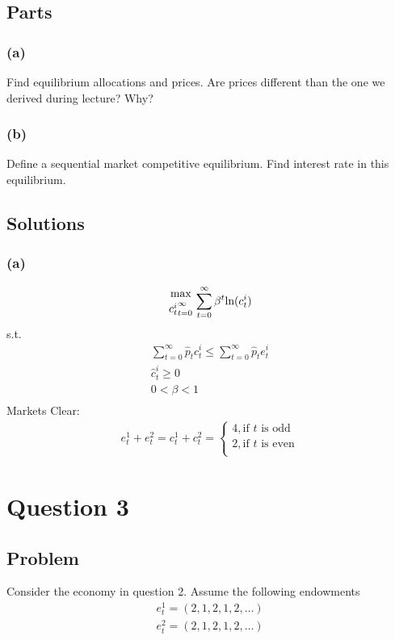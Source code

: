 \documentclass[10pt, a4paper]{article}
\begin{document}
  \subsection*{Parts}
    \subsubsection*{(a)}
      Find equilibrium allocations and prices. Are prices different than the one we derived during lecture? Why?

    \subsubsection*{(b)}
      Define a sequential market competitive equilibrium. Find interest rate in this equilibrium.

  \subsection*{Solutions}
    \subsubsection*{(a)}
      \begin{gather*}
        {\max\atop{c_t^i}_{t=0}^{\infty}}\sum\limits_{t=0}^{\infty}\beta^t\text{ln}(c_t^i)
      \end{gather*}
      s.t.
      \begin{gather*}
        \sum\limits_{t=0}^{\infty}\hat{p}_tc_t^i\leq\sum\limits_{t=0}^{\infty}\hat{p}_te_t^i \\
        \hat{c}_t^i\geq0 \\
        0<\beta<1 \\
      \end{gather*}
      Markets Clear:
      \begin{gather*}
        e_t^1+e_t^2 = c_t^1+c_t^2 = \begin{cases}
          4, \text{if $t$ is odd} \\
          2, \text{if $t$ is even} \\
        \end{cases}
      \end{gather*}
\section*{Question 3}
  \subsection*{Problem}
    Consider the economy in question 2. Assume the following endowments
    \begin{gather*}
      e^1_t = (2,1,2,1,2,\ldots)\\
      e^2_t = (2,1,2,1,2,\ldots)
    \end{gather*}
\end{document}
